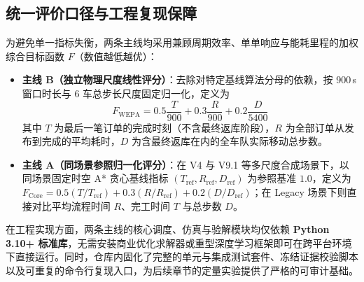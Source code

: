 \subsection{统一评价口径与工程复现保障}

为避免单一指标失衡，两条主线均采用兼顾周期效率、单单响应与能耗里程的加权综合目标函数 $F$（数值越低越优）：
\begin{itemize}
  \item \textbf{主线 B（独立物理尺度线性评分）}：去除对特定基线算法分母的依赖，按 900\,s 窗口时长与 6 车总步长尺度固定归一化，定义为
  \begin{equation}
    F_{\text{WEPA}} = 0.5\frac{T}{900} + 0.3\frac{R}{900} + 0.2\frac{D}{5400}
    \label{eq:obj-wepa-overview}
  \end{equation}
  其中 $T$ 为最后一笔订单的完成时刻（不含最终返库阶段），$R$ 为全部订单从发布到完成的平均耗时，$D$ 为含最终返库在内的全车队实际移动总步数。
  \item \textbf{主线 A（同场景参照归一化评分）}：在 V4 与 V9.1 等多尺度合成场景下，以同场景固定时空 A* 贪心基线指标 $(T_{\mathrm{ref}}, R_{\mathrm{ref}}, D_{\mathrm{ref}})$ 为参照基准 $1.0$，定义为 $F_{\text{Core}} = 0.5(T/T_{\mathrm{ref}}) + 0.3(R/R_{\mathrm{ref}}) + 0.2(D/D_{\mathrm{ref}})$；在 Legacy 场景下则直接对比平均流程时间 $R$、完工时间 $T$ 与总步数 $D$。
\end{itemize}

在工程实现方面，两条主线的核心调度、仿真与验解模块均仅依赖 \textbf{Python 3.10+ 标准库}，无需安装商业优化求解器或重型深度学习框架即可在跨平台环境下直接运行。同时，仓库内固化了完整的单元与集成测试套件、冻结证据校验脚本以及可重复的命令行复现入口，为后续章节的定量实验提供了严格的可审计基础。
